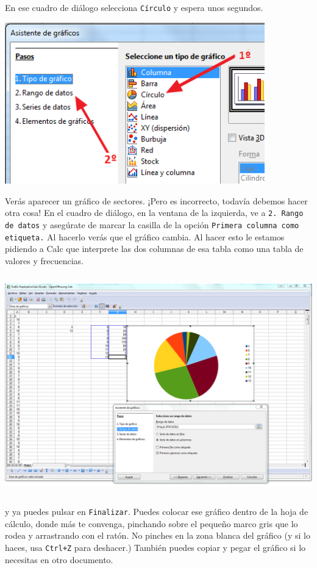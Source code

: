 \documentclass[10pt,a4paper]{article}\usepackage[]{graphicx}\usepackage[]{color}
\begin{document}
En ese cuadro de diálogo selecciona {\tt Círculo} y espera unos segundos.
    \begin{center}
    \includegraphics[height=7cm]{../fig/Tut01-Calc-Graficos-04.png}
    \end{center}
Verás aparecer un gráfico de sectores. ¡Pero es incorrecto, todavía debemos hacer otra cosa! En el cuadro de diálogo,
en la ventana de la izquierda, ve a {\tt 2. Rango de datos} y asegúrate de marcar la casilla de la opción {\tt Primera
columna como etiqueta.} Al hacerlo verás que el gráfico cambia. Al hacer esto le estamos pidiendo a Calc que interprete
las dos columnas de esa tabla como una tabla de valores y frecuencias.
    \begin{center}
    \includegraphics[height=9.5cm]{../fig/Tut01-Calc-Graficos-05.png}
    \end{center}
y ya puedes pulsar en {\tt Finalizar}. Puedes colocar ese gráfico dentro de la hoja de cálculo, donde más te convenga, pinchando sobre el pequeño marco gris que lo rodea y arrastrando con el ratón. No pinches en la zona blanca del gráfico (y si lo haces, usa {\tt Ctrl+Z} para deshacer.) También puedes copiar y pegar el gráfico si lo necesitas en otro documento.
\end{document}

